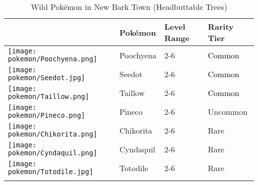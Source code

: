 \begin{longtable}{||l l l l||}%
\hline%
\rowcolor{GroundColor}%
&Pokémon&Level Range&Rarity Tier\\%
\hline%
\endhead%
\hline%
\rowcolor{GroundColor}%
\texttt{[image: pokemon/Poochyena.png]}&Poochyena&2{-}6&\textcolor{black}{%
Common%
}\\%
\hline%
\rowcolor{GroundColor}%
\texttt{[image: pokemon/Seedot.jpg]}&Seedot&2{-}6&\textcolor{black}{%
Common%
}\\%
\hline%
\rowcolor{GroundColor}%
\texttt{[image: pokemon/Taillow.png]}&Taillow&2{-}6&\textcolor{black}{%
Common%
}\\%
\hline%
\rowcolor{GroundColor}%
\texttt{[image: pokemon/Pineco.png]}&Pineco&2{-}6&\textcolor{OliveGreen}{%
Uncommon%
}\\%
\hline%
\rowcolor{GroundColor}%
\texttt{[image: pokemon/Chikorita.png]}&Chikorita&2{-}6&\textcolor{RedOrange}{%
Rare%
}\\%
\hline%
\rowcolor{GroundColor}%
\texttt{[image: pokemon/Cyndaquil.png]}&Cyndaquil&2{-}6&\textcolor{RedOrange}{%
Rare%
}\\%
\hline%
\rowcolor{GroundColor}%
\texttt{[image: pokemon/Totodile.jpg]}&Totodile&2{-}6&\textcolor{RedOrange}{%
Rare%
}\\%
\hline%
\caption{Wild Pokémon in New Bark Town (Headbuttable Trees)}%
\label{tab:NewBarkTownHeadbuttableTrees}%
\end{longtable}